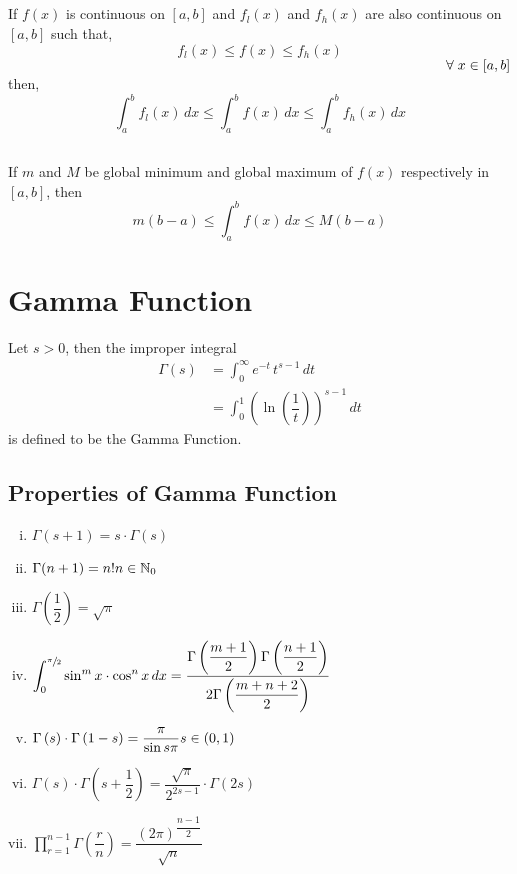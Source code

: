 \documentclass{article}
\begin{document}
\subsection{}
If $f(x)$ is continuous on $[a,b]$ and $f_{l}(x)$ and $f_{h}(x)$ are also continuous on $[a,b]$ such that,
$$f_{l}(x) \le f(x) \le f_{h}(x)$$
$\hspace{11cm}\forall \hspace{1mm} x \in [a,b]$
then, $$\displaystyle\int_{a}^{b} f_{l}(x) \, dx \le \displaystyle\int_{a}^{b} f(x) \, dx \le \displaystyle\int_{a}^{b} f_{h}(x) \, dx $$
\subsection{}
If $m$ and $M$ be global minimum and global maximum of $f(x)$ respectively in $[a,b]$, then
$$m(b-a) \le \displaystyle\int_{a}^{b} f(x) \, dx \le M(b-a)$$
\section{Gamma Function}
Let $s >0 $, then the improper integral \begin{align*}
    \Gamma (s) &=\displaystyle\int_{0}^{\infty} e^{-t} \, t^{s-1} \, dt \\[2mm]
    &= \displaystyle\int_{0}^{1} \left(\ln \left(\dfrac{1}{t} \right)\right)^{s-1} \, dt 
\end{align*}
is defined to be the Gamma Function.
\subsection{Properties of Gamma Function}
\begin{enumerate}[i.]
    \item $\Gamma (s+1)=s \cdot \Gamma (s)$
    \item $\Gamma (n+1)= n! \hfill n \in \mathbb{N}_{0}$
    \item $\Gamma \left(\dfrac{1}{2}\right)= \sqrt{\pi}$
    \item $\displaystyle\int_{0}^{\sfrac{\pi}{2}}\sin^m x \cdot \cos^n x  \, dx = \dfrac{\Gamma \left(\dfrac{m+1}{2} \right) \Gamma \left(\dfrac{n+1}{2} \right)}{2 \Gamma \left(\dfrac{m+n+2}{2} \right)} $
    \item $\Gamma \left(s\right) \cdot \Gamma \left(1-s\right)= \dfrac{\pi}{\sin s \pi} \hfill s \in (0,1)$
    \item $\Gamma \left(s\right) \cdot \Gamma \left(s + \dfrac{1}{2} \right)= \dfrac{\sqrt{\pi}}{2^{2s-1}} \cdot \Gamma \left(2s\right)$
    \item $\displaystyle\prod_{r=1}^{n-1} \Gamma \left(\dfrac{r}{n} \right)=\dfrac{\left(2 \pi\right)^{\dfrac{n-1}{2} }}{\sqrt{n}} $
\end{enumerate}
\end{document}
